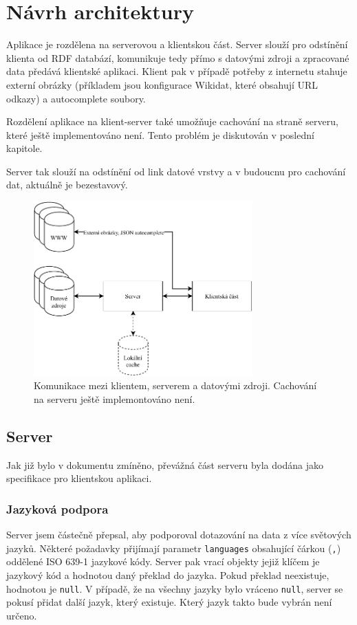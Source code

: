 \chapter{Návrh architektury}

Aplikace je rozdělena na serverovou a klientskou část. Server slouží pro odstínění klienta od RDF databází, komunikuje tedy přímo s datovými zdroji a zpracované data předává klientské aplikaci. Klient pak v případě potřeby z internetu stahuje externí obrázky (příkladem jsou konfigurace Wikidat, které obsahují URL odkazy) a autocomplete soubory.

Rozdělení aplikace na klient-server také umožňuje cachování na straně serveru, které ještě implementováno není. Tento problém je diskutován v poslední kapitole.

Server tak slouží na odstínění od link datové vrstvy a v budoucnu pro cachování dat, aktuálně je bezestavový.

\begin{figure}[h]
    \centering
    \includegraphics[width=0.75\textwidth]{media/communication.pdf}
    \caption{Komunikace mezi klientem, serverem a datovými zdroji. Cachování na serveru ještě implemontováno není.}
\end{figure}

\section{Server}
Jak již bylo v dokumentu zmíněno, převážná část serveru byla dodána jako specifikace pro klientskou aplikaci.

\subsection{Jazyková podpora} \label{jazykova-podpora}
Server jsem částečně přepsal, aby podporoval dotazování na data z více světových jazyků. Některé požadavky přijímají parametr \texttt{languages} obsahující čárkou (\texttt{,}) oddělené ISO 639-1 jazykové kódy. Server pak vrací objekty jejiž klíčem je jazykový kód a hodnotou daný překlad do jazyka. Pokud překlad neexistuje, hodnotou je \texttt{null}. V případě, že na všechny jazyky bylo vráceno \texttt{null}, server se pokusí přidat další jazyk, který existuje. Který jazyk takto bude vybrán není určeno.

